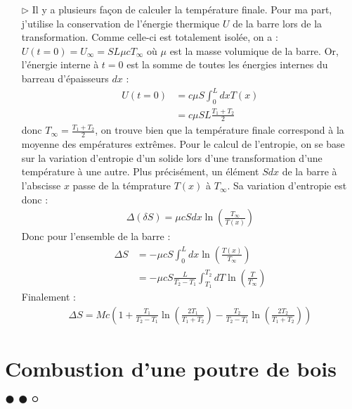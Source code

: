 \documentclass{report}
\begin{document}
\begin{itemize}
	\item[$\triangleright$] Il y a plusieurs façon de calculer la température finale. Pour ma part, j'utilise la conservation de l'énergie thermique $U$ de la barre lors de la transformation. Comme celle-ci est totalement isolée, on a :
	$U(t=0)=U_\infty=SL\mu c T_\infty$ où $\mu$ est la masse volumique de la barre.
	Or, l'énergie interne à $t=0$ est la somme de toutes les énergies internes du barreau d'épaisseurs $dx$ :
	\begin{align*}
		U(t=0) &= c\mu S\int_0^LdxT(x) \\
		&=c\mu SL\frac{T_1+T_2}{2}
	\end{align*}
	donc $T_\infty = \frac{T_1+T_2}{2}$, on trouve bien que la température finale correspond à la moyenne des empératures extrêmes. 
	Pour le calcul de l'entropie, on se base sur la variation d'entropie d'un solide lors d'une transformation d'une température à une autre. Plus précisément, un élément $Sdx$ de la barre à l'abscisse $x$ passe de la témprature $T(x)$ à $T_\infty$. Sa variation d'entropie est donc :
	\begin{align*}
		\Delta (\delta S) = \mu c S dx \ln\left(\frac{T_\infty}{T(x)} \right) 
	\end{align*}
	Donc pour l'ensemble de la barre :
	\begin{align*}
		\Delta S &= -\mu c S \int_0^Ldx \ln\left(\frac{T(x)}{T_\infty} \right) \\
		& = -\mu c S\frac{L}{T_2-T_1}\int_{T_1}^{T_2}dT\ln\left(\frac{T}{T_\infty}\right)
	\end{align*}
Finalement : 
\begin{align*}
\Delta S = Mc \left( 1 + \frac{T_1}{T_2-T_1}\ln\left(\frac{2T_1}{T_1+T_2}\right) - \frac{T_2}{T_2-T_1}\ln\left(\frac{2T_2}{T_1+T_2}\right)\right)
\end{align*}

\end{itemize}

\newpage

\section*{Combustion d'une poutre de bois $\bullet\bullet\circ$}
\end{document}
